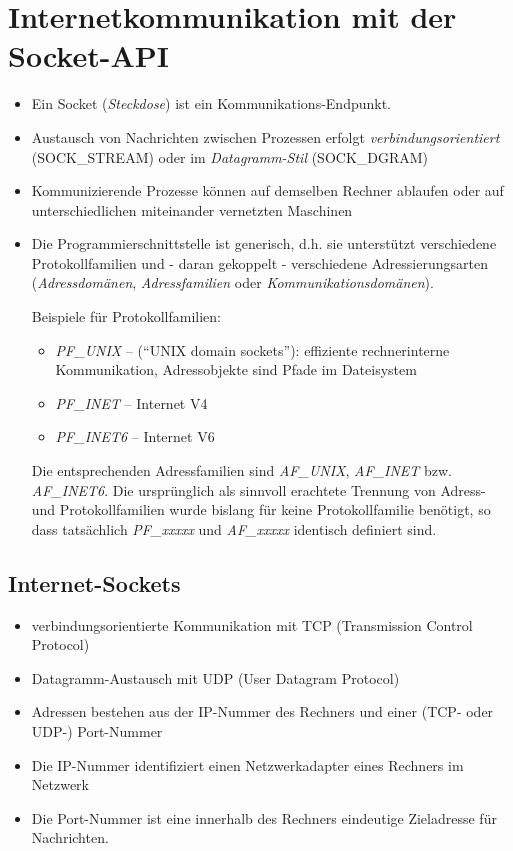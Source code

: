 \documentclass[12pt,utf8]{article}
\begin{document}
\section*{Internetkommunikation mit der Socket-API}

\begin{itemize}
\item
Ein Socket ({\em Steckdose\/}) ist ein Kommunikations-Endpunkt.

\item
Austausch von Nachrichten zwischen Prozessen erfolgt
{\em verbindungsorientiert\/} (SOCK\_STREAM) oder im {\em Datagramm-Stil\/}
(SOCK\_DGRAM)

\item
Kommunizierende Prozesse können auf demselben Rechner ablaufen oder
auf unterschiedlichen miteinander vernetzten Maschinen

\item
Die Programmierschnittstelle ist generisch, d.h. sie unterstützt verschiedene Protokollfamilien
und - daran gekoppelt - verschiedene Adressierungsarten
({\em Adressdomänen\/}, {\em Adressfamilien\/} oder {\em Kommunikationsdomänen\/}).

Beispiele für Protokollfamilien:
\begin{itemize}
\item  {\em PF\_UNIX} -- (``UNIX domain sockets''): effiziente rechnerinterne Kommunikation, Adressobjekte sind Pfade im Dateisystem
\item  {\em PF\_INET} -- Internet V4
\item  {\em PF\_INET6} -- Internet V6
\end{itemize}

Die entsprechenden Adressfamilien sind {\em AF\_UNIX}, {\em AF\_INET} bzw. {\em AF\_INET6}. Die
ursprünglich als sinnvoll erachtete Trennung von Adress- und Protokollfamilien
wurde bislang für keine Protokollfamilie benötigt, so dass tatsächlich {\em PF\_xxxxx} und   {\em AF\_xxxxx} identisch
 definiert sind. 
\end{itemize}


\subsection*{Internet-Sockets}

\begin{itemize}
\item  verbindungsorientierte Kommunikation mit TCP
(Transmission Control Protocol)
\item  Datagramm-Austausch mit UDP (User Datagram
Protocol)
\item Adressen bestehen aus der IP-Nummer des Rechners und einer (TCP- oder
   UDP-) Port-Nummer
\item  Die IP-Nummer identifiziert einen Netzwerkadapter eines Rechners
    im Netzwerk
\item Die Port-Nummer ist eine
innerhalb des Rechners eindeutige Zieladresse für Nachrichten.
\end{itemize}
\end{document}
